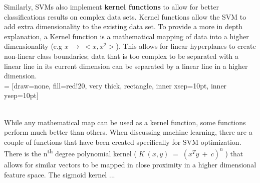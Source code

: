 \documentclass[svgnames]{report}
\begin{document}
        \indent Similarly, SVMs also implement \textbf{kernel functions} to allow for better classifications results on complex data sets. Kernel functions allow the SVM to add extra dimensionality to the existing data set. To provide a more in depth explanation, a Kernel function is a mathematical mapping of data into a higher dimensionality (e.g $x\; \rightarrow \; <x,x^2>$). This allows for linear hyperplanes to create non-linear class boundaries; data that is too complex to be separated with a linear line in its current dimension can be separated by a linear line in a higher dimension. \\
         = [draw=none, fill=red!20, very thick,
            rectangle, inner xsep=10pt, inner ysep=10pt]
         \\
        \indent While any mathematical map can be used as a kernel function, some functions perform much better than others. When discussing machine learning, there are a couple of functions that have been created specifically for SVM optimization. There is the n\textsuperscript{th} degree polynomial kernel ($\;K\:(x,y)\;=\;(x^Ty\:+\:c)^n\;$) that allows for similar vectors to be mapped in close proximity in a higher dimensional feature space. The sigmoid kernel ...
\end{document}
